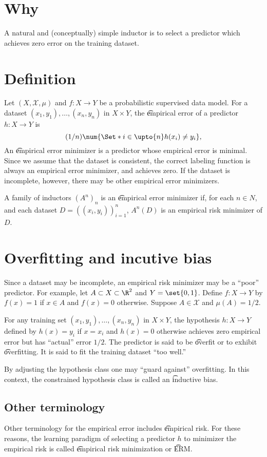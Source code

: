 

\section*{Why}

A natural and (conceptually) simple inductor is to select a predictor which achieves zero error on the training dataset.

\section*{Definition}

Let $(X, \mathcal{X} , \mu )$ and $f: X \to Y$ be a probabilistic supervised data model.
For a dataset $(x_1, y_1), \dots , (x_n, y_n)$ in $X \times Y$, the \t{empirical error} of a predictor $h: X \to Y$ is
\[
(1/n)\num{\Set*{i \in \upto{n}}{h(x_i) \neq y_i}},
\]
An \t{empirical error minimizer} is a predictor whose empirical error is minimal.
Since we assume that the dataset is consistent, the correct labeling function is always an empirical error minimizer, and achieves zero.
If the dataset is incomplete, however, there may be other empirical error minimizers.

A family of inductors $(A^n)_n$ is an \t{empirical error minimizer} if, for each $n \in N$, and each dataset $D = ((x_i, y_i))_{i = 1}^{n}$, $A^n(D)$ is an empirical risk minimizer of $D$.

\section*{Overfitting and incutive bias}

Since a dataset may be incomplete, an empirical risk minimizer may be a ``poor'' predictor.
For example, let $A \subset X \subset \R ^2$ and $Y = \set{0, 1}$.
Define $f: X \to Y$ by $f(x) = 1$ if $x \in A$ and $f(x) = 0$ otherwise.
Suppose $A \in \mathcal{X} $ and $\mu (A) = 1/2$.

For any training set $(x_1, y_1), \dots , (x_n, y_n)$ in $X \times Y$, the hypothesis $h: X \to Y$ defined by $h(x) = y_i$ if $x = x_i$ and $h(x) = 0$ otherwise achieves zero empirical error but has ``actual'' error $1/2$.
The predictor is said to be \t{overfit} or to exhibit \t{overfitting}.
It is said to fit the training dataset ``too well.''

By adjusting the hypothesis class one may ``guard against'' overfitting.
In this context, the constrained hypothesis class is called an \t{inductive bias}.

\subsection*{Other terminology}

Other terminology for the empirical error includes \t{empirical risk}.
For these reasons, the learning paradigm of selecting a predictor $h$ to minimizer the empirical risk is called \t{empirical risk minimization} or \t{ERM}.
